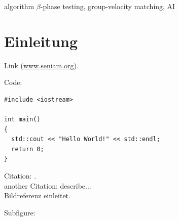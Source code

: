 %
%
%
%
%
%

\begin{abstract}
2nd File
\end{abstract}
\begin{keywords}
algorithm $\beta$-phase testing, group-velocity matching, AI
\end{keywords}

\section{Einleitung} 

Link (\url{www.seniam.org}).

Code:

\begin{lstlisting}[label={list:first},caption=Sample code.]
#include <iostream>
 
int main()
{
  std::cout << "Hello World!" << std::endl;
  return 0;
}
\end{lstlisting}

Citation: \citep{lohse_how_2010}. \\
another Citation: \cite{smeets_throwing_2002} describe...\\
Bildreferenz  einleitet. 

Subfigure:

